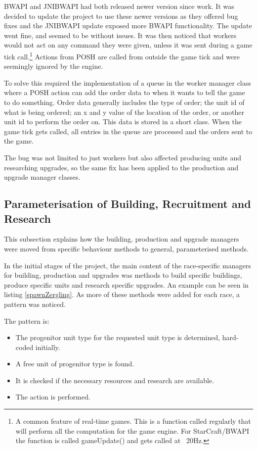 \documentclass[11pt,openright,a4paper]{report}
\begin{document}
BWAPI and JNIBWAPI had both released newer version since  work. It was decided to update the project to use these newer versions as they offered bug fixes and the JNIBWAPI update exposed more BWAPI functionality. The update went fine, and seemed to be without issues. It was then noticed that workers would not act on any command they were given, unless it was sent during a game tick call.\footnote{A common feature of real-time games. This is a function called regularly that will perform all the computation for the game engine. For StarCraft/BWAPI the function is called gameUpdate() and gets called at ~20Hz.} Actions from POSH are called from outside the game tick and were seemingly ignored by the engine.

To solve this required the implementation of a queue in the worker manager class where a POSH action can add the order data to when it wants to tell the game to do something. Order data generally includes the type of order; the unit id of what is being ordered; an x and y value of the location of the order, or another unit id to perform the order on. This data is stored in a short class. When the game tick gets called, all entries in the queue are processed and the orders sent to the game.

The bug was not limited to just workers but also affected producing units and researching upgrades, so the same fix has been applied to the production and upgrade manager classes.


\subsection{Parameterisation of Building, Recruitment and Research}
This subsection explains how the building, production and upgrade managers were moved from specific behaviour methods to general, parameterised methods.

In the initial stages of the project, the main content of the race-specific managers for building, production and upgrades was methods to build specific buildings, produce specific units and research specific upgrades. An example can be seen in listing \ref{spawnZergling}. As more of these methods were added for each race, a pattern was noticed.

The pattern is:
\begin{itemize}
\item{The progenitor unit type for the requested unit type is determined, hard-coded initially.}
\item{A free unit of progenitor type is found.}
\item{It is checked if the necessary resources and research are available.}
\item{The action is performed.}
\end{itemize}
\end{document}
